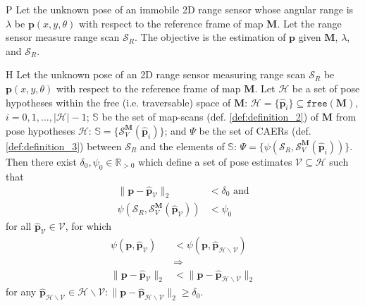\begin{customprb}{P}
  \label{prob:the_problem}
  Let the unknown pose of an immobile 2D range sensor whose angular range is
  $\lambda$ be $\bm{p}(x,y,\theta)$ with respect to the reference frame of map
  $\bm{M}$. Let the range sensor measure range scan $\mathcal{S}_R$. The
  objective is the estimation of $\bm{p}$ given $\bm{M}$, $\lambda$, and
  $\mathcal{S}_R$.
\end{customprb}

\begin{customhpt}{H}
  \label{hpt:hypothesis_h1}
  Let the unknown pose of an 2D range sensor measuring range scan
  $\mathcal{S}_R$ be $\bm{p}(x,y,\theta)$ with respect to the reference frame
  of map $\bm{M}$.  Let $\mathcal{H}$ be a set of pose hypotheses within the
  free (i.e. traversable) space of $\bm{M}$:
  $\mathcal{H} = \{\hat{\bm{p}}_i\} \subseteq \texttt{free}(\bm{M})$, $i=0,1,\dots,|\mathcal{H}|-1$; $\mathbb{S}$
  be the set of map-scans (def. \ref{def:definition_2}) of $\bm{M}$ from pose
  hypotheses $\mathcal{H}$:
  $\mathbb{S} = \{\mathcal{S}_V^{\bm{M}}(\hat{\bm{p}}_i)\}$; and $\Psi$ be the
  set of CAERs (def. \ref{def:definition_3}) between $\mathcal{S}_R$ and the
  elements of $\mathbb{S}$:
  $\Psi = \{\psi(\mathcal{S}_R, \mathcal{S}_V^{\bm{M}}(\hat{\bm{p}}_i))\}$.
  Then there exist $\delta_0,\psi_0 \in \mathbb{R}_{> 0}$ which define a set of
  pose estimates $\mathcal{V} \subseteq \mathcal{H}$ such that
  \begin{align}
    \|\bm{p}-\hat{\bm{p}}_\mathcal{V}\|_2 &< \delta_0 \nonumber \text{ and}\\
    \psi(\mathcal{S}_R,\mathcal{S}_V^{\bm{M}}(\hat{\bm{p}}_\mathcal{V})) &< \psi_0 \nonumber
  \end{align}
  for all $\hat{\bm{p}}_\mathcal{V} \in \mathcal{V}$, for which
  \begin{align}
    \psi(\bm{p}, \hat{\bm{p}}_\mathcal{V}) &< \psi(\bm{p}, \hat{\bm{p}}_{\mathcal{H} \backslash \mathcal{V}}) \nonumber \\
    &\Rightarrow \nonumber \\
    \|\bm{p}-\hat{\bm{p}}_\mathcal{V}\|_2 &< \|\bm{p}-\hat{\bm{p}}_{\mathcal{H} \backslash \mathcal{V}}\|_2 \nonumber
  \end{align}
  for any $\hat{\bm{p}}_{\mathcal{H} \backslash \mathcal{V}} \in {\mathcal{H} \backslash \mathcal{V}}: \|\bm{p}-\hat{\bm{p}}_{\mathcal{H} \backslash \mathcal{V}}\|_2 \geq \delta_0$.

\end{customhpt}
